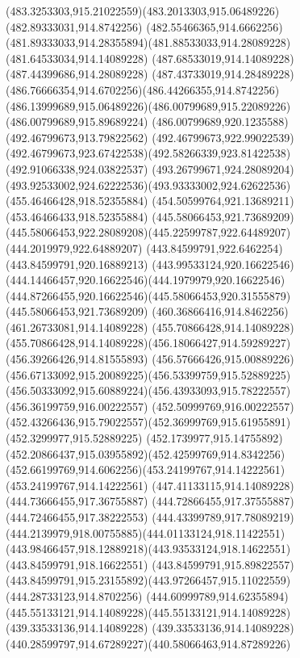 {{		\curveto(483.3253303,915.21022559)(483.2013303,915.06489226)(482.89333031,914.8742256)
		\curveto(482.55466365,914.6662256)(481.89333033,914.28355894)(481.88533033,914.28089228)
		\lineto(481.64533034,914.14089228)
		\lineto(487.68533019,914.14089228)
		\lineto(487.44399686,914.28089228)
		\curveto(487.43733019,914.28489228)(486.76666354,914.6702256)(486.44266355,914.8742256)
		\curveto(486.13999689,915.06489226)(486.00799689,915.22089226)(486.00799689,915.89689224)
		\lineto(486.00799689,920.1235588)
		\lineto(492.46799673,913.79822562)
		\lineto(492.46799673,922.99022539)
		\curveto(492.46799673,923.67422538)(492.58266339,923.81422538)(492.91066338,924.03822537)
		\curveto(493.26799671,924.28089204)(493.92533002,924.62222536)(493.93333002,924.62622536)
		\closepath
		\moveto(455.46466428,918.52355884)
		\lineto(454.50599764,921.13689211)
		\lineto(453.46466433,918.52355884)
		\closepath
		\moveto(445.58066453,921.73689209)
		\curveto(445.58066453,922.28089208)(445.22599787,922.64489207)(444.2019979,922.64889207)
		\lineto(443.84599791,922.6462254)
		\lineto(443.84599791,920.16889213)
		\curveto(443.99533124,920.16622546)(444.14466457,920.16622546)(444.1979979,920.16622546)
		\curveto(444.87266455,920.16622546)(445.58066453,920.31555879)(445.58066453,921.73689209)
		\moveto(460.36866416,914.8462256)
		\lineto(461.26733081,914.14089228)
		\lineto(455.70866428,914.14089228)
		\curveto(455.70866428,914.14089228)(456.18066427,914.59289227)(456.39266426,914.81555893)
		\curveto(456.57666426,915.00889226)(456.67133092,915.20089225)(456.53399759,915.52889225)
		\curveto(456.50333092,915.60889224)(456.43933093,915.78222557)(456.36199759,916.00222557)
		\lineto(452.50999769,916.00222557)
		\curveto(452.43266436,915.79022557)(452.36999769,915.61955891)(452.3299977,915.52889225)
		\curveto(452.1739977,915.14755892)(452.20866437,915.03955892)(452.42599769,914.8342256)
		\curveto(452.66199769,914.6062256)(453.24199767,914.14222561)(453.24199767,914.14222561)
		\lineto(447.41133115,914.14089228)
		\lineto(444.73666455,917.36755887)
		\lineto(444.72866455,917.37555887)
		\lineto(444.72466455,917.38222553)
		\curveto(444.43399789,917.78089219)(444.2139979,918.00755885)(444.01133124,918.11422551)
		\curveto(443.98466457,918.12889218)(443.93533124,918.14622551)(443.84599791,918.16622551)
		\lineto(443.84599791,915.89822557)
		\curveto(443.84599791,915.23155892)(443.97266457,915.11022559)(444.28733123,914.8702256)
		\curveto(444.60999789,914.62355894)(445.55133121,914.14089228)(445.55133121,914.14089228)
		\lineto(439.33533136,914.14089228)
		\curveto(439.33533136,914.14089228)(440.28599797,914.67289227)(440.58066463,914.87289226)
}}
